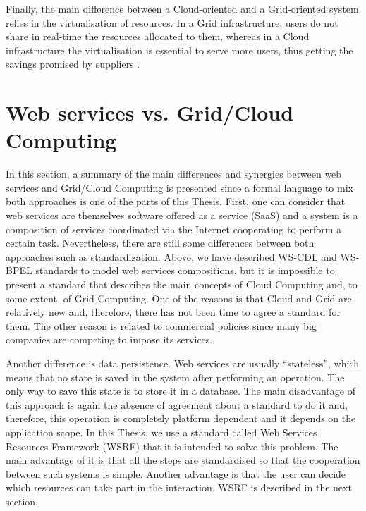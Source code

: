 Finally, the main difference between a Cloud-oriented and a Grid-oriented system relies in the virtualisation of resources. 
In a Grid infrastructure, users do not share in real-time the resources allocated to them, 
whereas in a Cloud infrastructure the virtualisation is essential to serve more users,
thus getting the savings promised by suppliers \cite{}.

\section{Web services vs. Grid/Cloud Computing}

In this section, a summary of the main differences and synergies between web services and
Grid/Cloud Computing is presented since a formal language to mix both approaches is one of the parts of this
Thesis. First, one can consider that web services are themselves software offered as a service (SaaS)
and a system is a composition of services coordinated via the Internet
cooperating to perform a certain task. Nevertheless, 
there are still some differences between both approaches such as standardization. Above,
we have described WS-CDL and WS-BPEL standards to model web services compositions, but
it is impossible to present a standard that describes the main concepts of Cloud Computing and, to some
extent, of Grid Computing. One of the reasons is that Cloud and Grid are relatively new and, therefore,
there has not been time to agree a standard for them. The other reason is related to commercial policies since
many big companies are competing to impose its services.  

Another difference is data persistence. Web services are usually ``stateless'', which means that
no state is saved in the system after performing an operation. The only way to save
this state is to store it in a database. The main disadvantage of this approach is again the absence of 
agreement about a standard to do it and, therefore, this operation is completely platform dependent 
and it depends on the application scope. 
In this Thesis, we use a standard called Web Services Resources Framework (WSRF) that it is intended to solve this problem. 
The main advantage of it is that all the steps are standardised so that the cooperation 
between such systems is simple. Another advantage is that the user can decide which 
resources can take part in the interaction. WSRF is described in the next section. 

